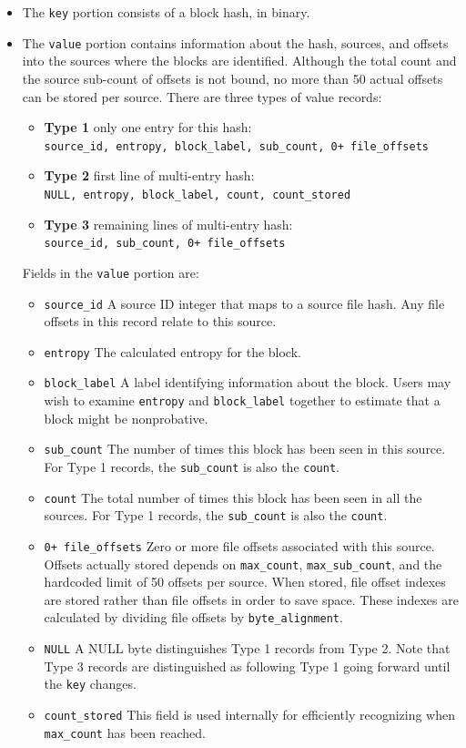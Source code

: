 \documentclass[11pt,fleqn]{article} %
\begin{document}
\begin{itemize}
\item The \verb+key+ portion consists of a block hash, in binary.
\item The \verb+value+ portion contains information about the hash, sources, and offsets into the sources where the blocks are identified. Although the total count and the source sub-count of offsets is not bound, no more than 50 actual offsets can be stored per source.  There are three types of value records:
  \begin{itemize}
  \item \textbf{Type 1} only one entry for this hash:\\
\verb-source_id, entropy, block_label, sub_count, 0+ file_offsets-
  \item \textbf{Type 2} first line of multi-entry hash:\\
\verb-NULL, entropy, block_label, count, count_stored-
  \item \textbf{Type 3} remaining lines of multi-entry hash:\\
\verb-source_id, sub_count, 0+ file_offsets-
  \end{itemize}
Fields in the \verb+value+ portion are:
  \begin{itemize}
  \item \verb+source_id+ A source ID integer that maps to a source file hash. Any file offsets in this record relate to this source.
  \item \verb+entropy+ The calculated entropy for the block.
  \item \verb+block_label+ A label identifying information about the block.  Users may wish to examine \verb+entropy+ and \verb+block_label+ together to estimate that a block might be nonprobative.
  \item \verb+sub_count+ The number of times this block has been seen in this source. For Type 1 records, the \verb+sub_count+ is also the \verb+count+.
  \item \verb+count+ The total number of times this block has been seen in all the sources. For Type 1 records, the \verb+sub_count+ is also the \verb+count+.
  \item \verb-0+ file_offsets- Zero or more file offsets associated with this source. Offsets actually stored depends on \verb+max_count+, \verb+max_sub_count+, and the hardcoded limit of 50 offsets per source. When stored, file offset indexes are stored rather than file offsets in order to save space. These indexes are calculated by dividing file offsets by \verb+byte_alignment+.
  \item \verb+NULL+ A NULL byte distinguishes Type 1 records from Type 2. Note that Type 3 records are distinguished as following Type 1 going forward until the \verb+key+ changes.
  \item \verb+count_stored+ This field is used internally for efficiently recognizing when \verb+max_count+ has been reached.
  \end{itemize}
\end{itemize}
\end{document}
